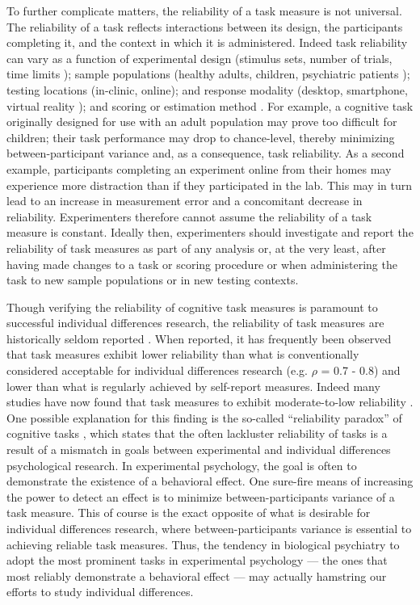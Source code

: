 \documentclass[a4paper,notitlepage,12pt]{article}
\begin{document}
To further complicate matters, the reliability of a task measure is not universal. The reliability of a task reflects interactions between its design, the participants completing it, and the context in which it is administered. Indeed task reliability can vary as a function of experimental design (stimulus sets, number of trials, time limits \cite{paap2016role, cooper2017role}); sample populations (healthy adults, children, psychiatric patients \cite{arnon2020current, cooper2017role}); testing locations (in-clinic, online); and response modality (desktop, smartphone, virtual reality \cite{pronk2022can, bruder2021reliability}); and scoring or estimation method \cite{Rouder2019-am, haines2020learning}. For example, a cognitive task originally designed for use with an adult population may prove too difficult for children; their task performance may drop to chance-level, thereby minimizing between-participant variance and, as a consequence, task reliability. As a second example, participants completing an experiment online from their homes may experience more distraction than if they participated in the lab. This may in turn lead to an increase in measurement error and a concomitant decrease in reliability. Experimenters therefore cannot assume the reliability of a task measure is constant. Ideally then, experimenters should investigate and report the reliability of task measures as part of any analysis or, at the very least, after having made changes to a task or scoring procedure or when administering the task to new sample populations or in new testing contexts.


Though verifying the reliability of cognitive task measures is paramount to successful individual differences research, the reliability of task measures are historically seldom reported \cite{Green2016-xw, Parsons2019-jw}. When reported, it has frequently been observed that task measures exhibit lower reliability than what is conventionally considered acceptable for individual differences research (e.g. $\rho$ = 0.7 - 0.8) and lower than what is regularly achieved by self-report measures. Indeed many studies have now found that task measures to exhibit moderate-to-low reliability \cite{Hedge2018-lf, Frey2017-uz, Enkavi2019-oh, Von_Bastian2020-tm, Nitsch2022-pe, verdejo2021unified}. One possible explanation for this finding is the so-called ``reliability paradox'' of cognitive tasks \cite{hedge2018reliability}, which states that the often lackluster reliability of tasks is a result of a mismatch in goals between experimental and individual differences psychological research. In experimental psychology, the goal is often to demonstrate the existence of a behavioral effect. One sure-fire means of increasing the power to detect an effect is to minimize between-participants variance of a task measure. This of course is the exact opposite of what is desirable for individual differences research, where between-participants variance is essential to achieving reliable task measures. Thus, the tendency in biological psychiatry to adopt the most prominent tasks in experimental psychology --- the ones that most reliably demonstrate a behavioral effect --- may actually hamstring our efforts to study individual differences. 
\end{document}
